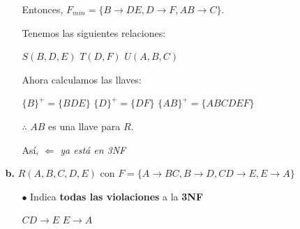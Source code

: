 \documentclass[12pt, letterpaper]{article}
\begin{document}
\begin{itemize}
\begin{itemize}
\begin{itemize}
                                        Entonces, $F_{min}=\{B \rightarrow DE, D\rightarrow F, AB \rightarrow C\}$.\vspace{.3cm}

                                        Tenemos las siguientes relaciones: \vspace{.1cm}

                                        $S(B,D,E)$ \hspace{.5cm} $T(D,F)$ \hspace{.5cm} $U(A,B,C)$ \vspace{.3cm}

                                        Ahora calculamos las llaves:\vspace{.1cm}

                                        $\{B\}^+=\{BDE\}$ \hspace{.5cm} $\{D\}^+=\{DF\}$ \hspace{.5cm} $\{AB\}^+=\{ABCDEF\}$\vspace{.1cm}

                                        $\therefore$ $AB$ es una llave para $R$.\vspace{.3cm}

                                        Así,  \checkmark $\Leftarrow$ \textit{ya está en 3NF}

                    \end{itemize}\vspace{.3cm}

                \item[\textbf{b.}]   $R(A,B,C,D,E)$ con $F = \{A \rightarrow BC,
                                     B \rightarrow D, CD \rightarrow E,
                                     E \rightarrow A\}$

                    \begin{itemize}

                        \item[$\bullet$] Indica \textbf{todas las violaciones} a 
                                        la \textbf{3NF} \vspace{.1cm}

                                        \begin{center}
                                            $CD \rightarrow E $ \hspace{.5cm} $E \rightarrow A$
                                        \end{center}


\end{itemize}
\end{itemize}
\end{itemize}
\end{document}
